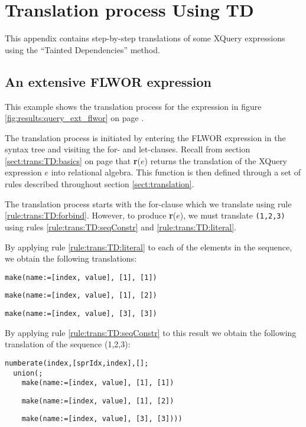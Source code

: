 \chapter{Translation process Using TD}
\label{appendix:transl}
This appendix contains step-by-step translations of some XQuery expressions
using the ``Tainted Dependencies'' method.

\section{An extensive FLWOR expression}
\label{appendix:transl:ext_flwor}
This example shows the translation process for the expression in figure
\ref{fig:results:query_ext_flwor} on page \pageref{fig:results:query_ext_flwor}.

The translation process is initiated by entering the FLWOR expression in the
syntax tree and visiting the for- and let-clauses. Recall from section
\ref{sect:trans:TD:basics} on page \pageref{sect:trans:TD:basics} that
\textbf{r}($e$) returns the translation of the XQuery expression $e$ into
relational algebra. This function is then defined through a set of rules
described throughout section \ref{sect:translation}.

The translation process starts with the for-clause which we translate using
rule \ref{rule:trans:TD:forbind}. However, to produce \textbf{r}($e$), we must
translate \texttt{(1,2,3)} using rules \ref{rule:trans:TD:seqConstr} and
\ref{rule:trans:TD:literal}. 

By applying rule \ref{rule:trans:TD:literal} to each of the elements in the
sequence, we obtain the following translations:
\begin{Verbatim}
make(name:=[index, value], [1], [1])
\end{Verbatim}
\begin{Verbatim}
make(name:=[index, value], [1], [2])
\end{Verbatim}
\begin{Verbatim}
make(name:=[index, value], [3], [3])
\end{Verbatim}

By applying rule \ref{rule:trans:TD:seqConstr} to this result we obtain the
following translation of the sequence (1,2,3):

\begin{Verbatim}
numberate(index,[sprIdx,index],[];
  union(;
    make(name:=[index, value], [1], [1])
    \end{Verbatim}
    \begin{Verbatim}
    make(name:=[index, value], [1], [2])
    \end{Verbatim}
    \begin{Verbatim}
    make(name:=[index, value], [3], [3])))
\end{Verbatim}

